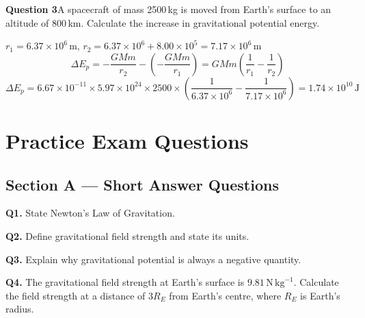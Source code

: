 \bigskip
\noindent\textbf{Question 3}\quad A spacecraft of mass 2500\,kg is moved from
Earth's surface to an altitude of 800\,km. Calculate the increase in gravitational
potential energy.

\begin{solutionbox}
$r_1 = 6.37\times10^6\,\mathrm{m}$,\quad
$r_2 = 6.37\times10^6 + 8.00\times10^5 = 7.17\times10^6\,\mathrm{m}$
\[
  \Delta E_p = -\frac{GMm}{r_2} - \left(-\frac{GMm}{r_1}\right)
             = GMm\left(\frac{1}{r_1} - \frac{1}{r_2}\right)
\]
\[
  \Delta E_p = 6.67\times10^{-11} \times 5.97\times10^{24} \times 2500
               \times \left(\frac{1}{6.37\times10^6} - \frac{1}{7.17\times10^6}\right)
             = 1.74\times10^{10}\,\mathrm{J}
\]
\end{solutionbox}

\newpage
\section{Practice Exam Questions}

\subsection*{Section A — Short Answer Questions}

\noindent\begin{minipage}{\textwidth}
\textbf{Q1.} State Newton's Law of Gravitation.

\answerbox{2.5cm}
\end{minipage}

\bigskip
\noindent\begin{minipage}{\textwidth}
\textbf{Q2.} Define gravitational field strength and state its units.

\answerbox{2.5cm}
\end{minipage}

\bigskip
\noindent\begin{minipage}{\textwidth}
\textbf{Q3.} Explain why gravitational potential is always a negative quantity.

\answerbox{3cm}
\end{minipage}

\bigskip
\noindent\begin{minipage}{\textwidth}
\textbf{Q4.} The gravitational field strength at Earth's surface is
$9.81\,\mathrm{N\,kg}^{-1}$. Calculate the field strength at a distance of $3R_E$
from Earth's centre, where $R_E$ is Earth's radius.

\answerbox{3cm}
\end{minipage}

